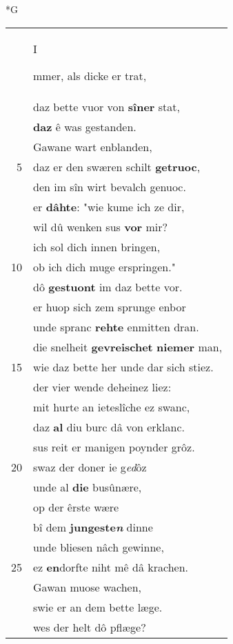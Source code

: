 \documentclass[8pt,a4paper,notitlepage]{article}
\begin{document}
\begin{table}[ht]
\begin{minipage}[t]{0.5\linewidth}
\small
\begin{center}*G
\end{center}
\begin{tabular}{rl}
 & \begin{large}I\end{large}mmer, als dicke er trat,\\ 
 & daz bette vuor von \textbf{sîner} stat,\\ 
 & \textbf{daz} ê was gestanden.\\ 
 & Gawane wart enblanden,\\ 
5 & daz er den swæren schilt \textbf{getruoc},\\ 
 & den im sîn wirt bevalch genuoc.\\ 
 & er \textbf{dâhte}: "wie kume ich ze dir,\\ 
 & wil dû wenken sus \textbf{vor} mir?\\ 
 & ich sol dich innen bringen,\\ 
10 & ob ich dich muge erspringen."\\ 
 & dô \textbf{gestuont} im daz bette vor.\\ 
 & er huop sich zem sprunge enbor\\ 
 & unde spranc \textbf{rehte} enmitten dran.\\ 
 & die snelheit \textbf{gevreischet} \textbf{niemer} man,\\ 
15 & wie daz bette her unde dar sich stiez.\\ 
 & der vier wende deheinez liez:\\ 
 & mit hurte an ieteslîche ez swanc,\\ 
 & daz \textbf{al} diu burc dâ von erklanc.\\ 
 & sus reit er manigen poynder grôz.\\ 
20 & swaz der doner ie g\textit{ed}ôz\\ 
 & unde al \textbf{die} busûnære,\\ 
 & op der êrste wære\\ 
 & bî dem \textbf{jungeste\textit{n}} dinne\\ 
 & unde bliesen nâch gewinne,\\ 
25 & ez \textbf{en}dorfte niht mê dâ krachen.\\ 
 & Gawan muose wachen,\\ 
 & swie er an dem bette læge.\\ 
 & wes der helt dô pflæge?\\ 

\end{tabular}
\end{minipage}
\end{table}
\end{document}
